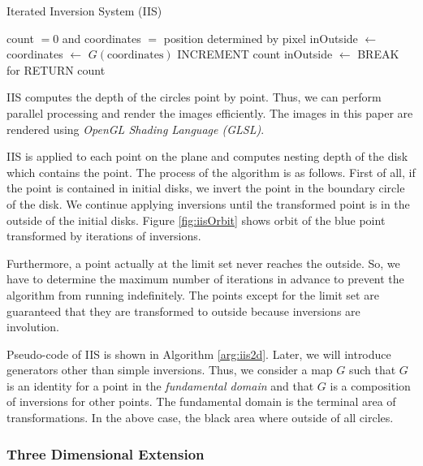  \begin{algorithm}
  \caption{Iterated Inversion System (IIS)}
  \label{arg:iis2d}
  \begin{algorithmic}
   \REQUIRE count $= 0$ and coordinates $=$ position determined by
   pixel
   \STATE inOutside $\leftarrow$ \TRUE
   \STATE coordinates $\leftarrow$ $G(\text{coordinates})$
   \STATE INCREMENT count
   \STATE inOutside $\leftarrow$ \FALSE
   \ENDIF
   \ENDFOR
   \STATE BREAK for
   \ENDIF
   \ENDFOR
   \STATE RETURN count
  \end{algorithmic}
 \end{algorithm}

\noindent IIS computes the depth of the circles point by point.
Thus, we can perform parallel processing and render the images efficiently.
The images in this paper are rendered using \textit{OpenGL Shading
Language (GLSL)}.

IIS is applied to each point on the plane and computes nesting depth of
the disk which contains the point.
The process of the algorithm is as follows.
First of all, if the point is contained in initial disks, we invert the
point in the boundary circle of the disk.
We continue applying inversions until the transformed point is in the
outside of the initial disks.
Figure \ref{fig:iisOrbit} shows orbit of the blue point transformed by
iterations of inversions.

Furthermore, a point actually at the limit set never reaches the
outside. So, we have to determine the maximum number of iterations in
advance to prevent the algorithm from running indefinitely.
The points except for the limit set are guaranteed that they
are transformed to outside because inversions are involution.

Pseudo-code of IIS is shown in Algorithm \ref{arg:iis2d}.
Later, we will introduce generators other than simple inversions.
Thus, we consider a map $G$ such that $G$ is an identity for a point in the
\textit{fundamental domain} and that $G$ is a composition of inversions for other
points.
The fundamental domain is the terminal area of transformations. 
In the above case, the black area where outside of all circles.

\subsubsection{Three Dimensional Extension}

